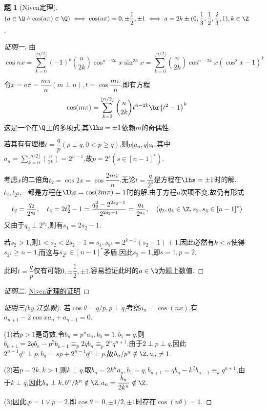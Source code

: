 \documentclass{article}
\theoremstyle{definition}
\newtheorem{exercise}{题}[section]
\begin{document}
\begin{exercise}[Niven定理]
    $(a\in \Q\land \cos(a\pi)\in\Q) \iff \cos(a\pi)=0,\pm\dfrac{1}{2},\pm 1\iff a=2k\pm(0,\dfrac{1}{3},\dfrac{1}{2},\dfrac{2}{3},1) ,k\in\Z$.
\end{exercise}
\begin{proof}[证明一]
    由$$ \cos nx=\sum_{k=0}^{\lfloor n/2 \rfloor}(-1)^k\binom{n}{2k}\cos^{n-2k}x\sin^{2k}x=\sum_{k=0}^{\lfloor n/2 \rfloor}\binom{n}{2k}\cos^{n-2k}x(\cos^2 x-1)^k$$

    令$x=a\pi=\dfrac{m\pi}{n} (m\perp n), t=\cos\dfrac{m\pi}{n}$,即有方程$$ \cos(m\pi)=\sum_{k=0}^{\lfloor n/2 \rfloor}\binom{n}{2k}t^{n-2k}\br{t^2-1}^k$$
    这是一个在$\Q$上的多项式,其$\lhs=\pm 1$依赖$m$的奇偶性.

    若其有有理根$t=\dfrac{q}{p} (p\perp q, 0<p\geq q)$,则$p|a_n,q|a_0$,其中$ a_n=\sum_{k=0}^{\lfloor n/2 \rfloor}\binom{n}{2k}=2^{n-1}$,故$p=2^s (s\in [n-1]^*)$.

    考虑$x$的二倍角$t_2=\cos 2x=\cos\dfrac{2m\pi}{n}$,无论$t=\dfrac{q}{2^s}$是方程在$\lhs=\pm 1$时的解,$t_2, t_{2^2}, \cdots $都是方程在$\lhs=\cos(2m\pi)=1$时的解.由于方程$n$次项不变,故仍有形式$$t_2=\dfrac{q_2}{2^{s_2}},\quad t_4=2t^2_2-1=\dfrac{q^2_2-2^{2s_2-1}}{2^{2s_2-1}}=\dfrac{q_4}{2^{s_4}},\quad (q_2,q_4\in \Z, s_2,s_4\in [n-1]^*)$$
    又由于$q_2\perp 2^{s_2}$,则有$s_4=2s_2-1$.

    若$s_2>1$,则$1<s_2<2s_2-1=s_4, s_{2^k}=2^{k-1}(s_2-1)+1$.因此必然有$k<n$使得$s_{2^k}\geq n-1$,而这与$s_{2^k}\in [n-1]^*$矛盾.因此$s_2=1$,即$s=1, p=2$.

    此时$t=\dfrac{q}{p}$仅有可能$0,\pm \dfrac{1}{2},\pm 1$,容易验证此时的$a\in \Q$为题上数值.
\end{proof}
\begin{proof}[证明二]
    \href{https://proofwiki.org/wiki/Niven's_Theorem}{Niven定理的证明}
\end{proof}
\begin{proof}[证明三(by 江弘毅)]
    若$\cos \theta=q/p, p\perp q$,考察$a_n=\cos(nx)$,有$a_{n+1}-2\cos x a_n+a_{n-1}=0$.

    (1)若$p>1$是奇数,令$b_n=p^n a_n, b_0=1, b_1=q$,则$b_{n+1}=2qb_n-p^2b_{n-1}\equiv_p 2qb_n\equiv_p 2^nq^{n+1}$.由于$2\perp p\perp q$,因此$2^{n-1}q^n\perp p, b_n=sp+2^{n-1}q^n\perp p$,故$b_n/p^n\notin\Z, a_n\neq 1$.

    (2)若$p=2k,k>1$,则$k\perp q$.取$b_n=2k^na_n, b_1=q, b_{n+1}=qb_n-k^2b_{n-1}\equiv_k q^{n+1}$,由于$k\perp q$,因此$b_n\perp k, b^n/k^n\notin \Z, a_n=\dfrac{b_n}{2k^n}\notin \Z$.

    (3)因此,$p=1\lor p=2$,即$\cos \theta=0,\pm 1/2, \pm 1$时存在$\cos(n\theta)=1$.
\end{proof}
\end{document}
